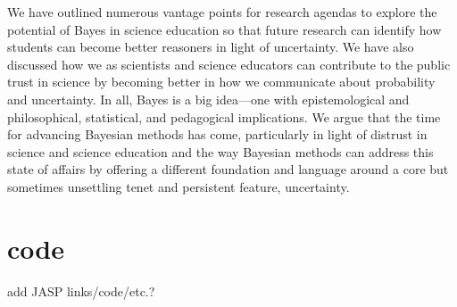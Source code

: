 \documentclass[man]{apa7}
\begin{document}
We have outlined numerous vantage points for research agendas to explore the potential of Bayes in science education so that future research can identify how students can become better reasoners in light of uncertainty. We have also discussed how we as scientists and science educators can contribute to the public trust in science by becoming better in how we communicate about probability and uncertainty. In all, Bayes is a big idea—one with epistemological and philosophical, statistical, and pedagogical implications. We argue that the time for advancing Bayesian methods has come, particularly in light of distrust in science and science education and the way Bayesian methods can address this state of affairs by offering a different foundation and language around a core but sometimes unsettling tenet and persistent feature, uncertainty. 

\printbibliography

\appendix

\section{code}
add JASP links/code/etc.?
\end{document}
